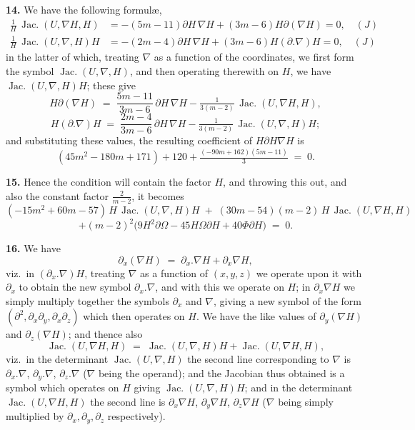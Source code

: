 \documentclass[11pt,a4paper]{article}
\providecommand{\Jac}{\operatorname{Jac.}}
\begin{document}
\textbf{14.} We have the following formul{\ae},
\begin{align*}
\tfrac{1}{H}\,\Jac(U,\nabla H,H) &= -(5m-11)\partial H\,\nabla H + (3m-6)H\partial(\nabla H) = 0,\quad (J) \\
\tfrac{1}{H}\,\Jac(U,\nabla,H)H &= -(2m-4)\partial H\,\nabla H + (3m-6)H(\partial.\nabla)H = 0,\quad (J)
\end{align*}
in the latter of which, treating $\nabla$ as a function of the coordinates, we first form the symbol $\Jac(U,\nabla,H)$, and then operating therewith on $H$, we have $\Jac(U,\nabla,H)H$; these give
\[
H\partial(\nabla H) \;=\; \frac{5m-11}{3m-6}\,\partial H\,\nabla H - \tfrac{1}{3(m-2)}\,\Jac(U,\nabla H,H),
\]
\[
H(\partial.\nabla)H \;=\; \frac{2m-4}{3m-6}\,\partial H\,\nabla H - \tfrac{1}{3(m-2)}\,\Jac(U,\nabla,H)H;
\]
and substituting these values, the resulting coefficient of $H\partial H\nabla H$ is
\[
(45m^2-180m+171) + 120 + \tfrac{(-90m+162)(5m-11)}{3} \;=\; 0.
\]

\medskip

\textbf{15.} Hence the condition will contain the factor $H$, and throwing this out, and also the constant factor $\frac{2}{m-2}$, it becomes
\[
(-15m^2+60m-57)\,H\,\Jac(U,\nabla,H)H \;+\; (30m-54)(m-2)\,H\,\Jac(U,\nabla H,H)
\]
\[
+ (m-2)^2\bigl(9H^2\partial\Omega - 45H\Omega\partial H + 40\Phi\partial H\bigr) \;=\; 0.
\]

\textbf{16.} We have
\[
\partial_x(\nabla H) \;=\; \partial_x.\nabla\!H + \partial_x\nabla\!H,
\]
viz.\ in $(\partial_x.\nabla)H$, treating $\nabla$ as a function of $(x,y,z)$ we operate upon it with $\partial_x$ to obtain the new symbol $\partial_x.\nabla$, and with this we operate on $H$; in $\partial_x\nabla H$ we simply multiply together the symbols $\partial_x$ and $\nabla$, giving a new symbol of the form $(\partial^2,\partial_x\partial_y,\partial_x\partial_z)$ which then operates on $H$. We have the like values of $\partial_y(\nabla H)$ and $\partial_z(\nabla H)$; and thence also
\[
\Jac(U,\nabla H,H) \;=\; \Jac(U,\nabla,H)H + \Jac(U,\nabla\!H,H),
\]
viz.\ in the determinant $\Jac(U,\nabla,H)$ the second line corresponding to $\nabla$ is $\partial_x.\nabla$, $\partial_y.\nabla$, $\partial_z.\nabla$ ($\nabla$ being the operand); and the Jacobian thus obtained is a symbol which operates on $H$ giving $\Jac(U,\nabla,H)H$; and in the determinant $\Jac(U,\nabla\!H,H)$ the second line is $\partial_x\nabla H$, $\partial_y\nabla H$, $\partial_z\nabla H$ ($\nabla$ being simply multiplied by $\partial_x,\partial_y,\partial_z$ respectively).
\end{document}
